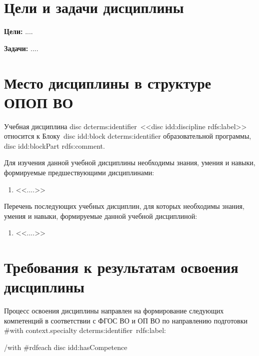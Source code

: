 \documentclass[12pt]{scrartcl}
\newcommand{\rdf}[2]{#2}
\newenvironment{rdfctx}[1]{}{}
\renewcommand{\paragraph}[1]{\par\textbf{#1}}
\begin{document}
\section{Цели и задачи дисциплины}
\begin{rdfctx}{\rdfsetctx{dc}{syll wpdd:courseDC !wpdd:CourseDC}}
\paragraph{Цели: }\rdf{dc wpdd:aim !cnt:ContentAsText}{....}
\paragraph{Задачи: }\rdf{dc wpdd:problem !cnt:ContentAsText}{....}
\end{rdfctx}

\section{Место дисциплины в структуре ОПОП ВО}
Учебная дисциплина {{disc dcterms:identifier}}~<<{{disc idd:discipline rdfs:label}}>> относится к
Блоку~{{disc idd:block dcterms:identifier}} образовательной программы, {{disc idd:blockPart rdfs:comment}}.

\begin{rdfctx}{\rdfsetctx{dc}{syll wpdd:courseDC !wpdd:CourseDC}}
Для изучения данной учебной дисциплины необходимы знания, умения и навыки,
формируемые предшествующими дисциплинами: \rdf{dc wpdd:require !cnt:ContentAsText}{%
  \begin{enumerate}
  \item <<....>>
  \end{enumerate}}

Перечень последующих учебных дисциплин, для которых необходимы знания, умения и
навыки, формируемые данной учебной дисциплиной: \rdf{dc wpdd:ensure !cnt:ContentAsText}{%
  \begin{enumerate}
  \item <<....>>
  \end{enumerate}}
\end{rdfctx}


\section{Требования к результатам освоения дисциплины}

Процесс освоения дисциплины направлен на формирование следующих компетенций в
соответствии с ФГОС ВО и ОП ВО по направлению подготовки {{#with context.specialty}}
{{dcterms:identifier}}~{{rdfs:label}}: \par {{/with}}
{{#rdfeach disc idd:hasCompetence}}
\end{document}
